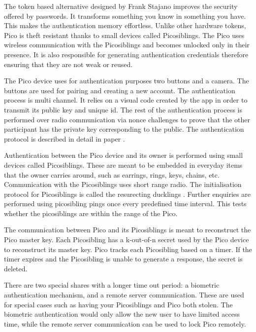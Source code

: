 The token based alternative designed by Frank Stajano improves the security offered by passwords. It transforms something you know in something you have. This makes the authentication memory effortless. Unlike other hardware tokens, Pico is theft resistant thanks to small devices called Picosiblings. The Pico uses wireless communication with the Picosiblings and becomes unlocked only in their presence. It is also responsible for generating authentication credentials therefore ensuring that they are not weak or reused.

The Pico device uses for authentication purposes two buttons and a camera. The buttons are used for pairing and creating a new account. The authentication process is multi channel. It relies on a visual code created by the app in order to transmit its public key and unique id. The rest of the authentication process is performed over radio communication via nonce challenges to prove that the other participant has the private key corresponding to the public. The authentication protocol is described in detail in paper \cite{stajano2011pico}.

Authentication between the Pico device and its owner is performed using small devices called Picosiblings. These are meant to be embedded in everyday items that the owner carries around, such as earrings, rings, keys, chains, etc. Communication with the Picosiblings uses short range radio. The initialisation protocol for Picosiblings is called the resurecting ducklings \cite{stajano2000resurrecting}. Further enquiries are performed using picosibling pings once every predefined time interval. This tests whether the picosiblings are within the range of the Pico.

The communication between Pico and its Picosiblings is meant to reconstruct the Pico master key. Each Picosibling has a k-out-of-n secret used by the Pico device to reconstruct its master key. Pico tracks each Picosibling based on a timer. If the timer expires and the Picosibling is unable to generate a response, the secret is deleted. 

There are two special shares with a longer time out period: a biometric authentication mechanism, and a remote server communication. These are used for special cases such as having your Picosiblings and Pico both stolen. The biometric authentication would only allow the new user to have limited access time, while the remote server communication can be used to lock Pico remotely.








